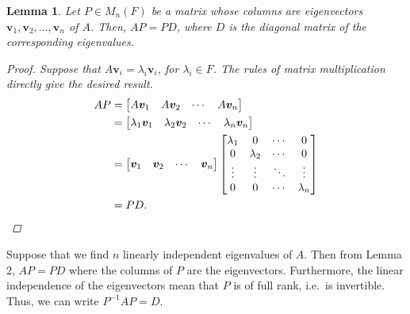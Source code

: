 \documentclass[10pt]{article}
\def\v{\bm{v}}
\newtheorem{lemma}{Lemma}
\begin{document}
        \begin{lemma}
                Let $P \in M_n(F)$ be a matrix whose columns are eigenvectors $\v_1, \v_2, \dots, \v_n$ of $A$.
                Then, $AP = PD$, where $D$ is the diagonal matrix of the corresponding eigenvalues.
                \begin{proof}
                        Suppose that $A\v_i = \lambda_i\v_i$, for $\lambda_i \in F$. The rules of matrix multiplication directly give
                        the desired result.
                        \begin{align*}
                                AP &= \begin{bmatrix} A\v_1 & A\v_2 & \cdots & A\v_n \end{bmatrix}\\
                                &= \begin{bmatrix} \lambda_1\v_1 & \lambda_2\v_2 & \cdots & \lambda_n\v_n \end{bmatrix} \\
                                &= \begin{bmatrix}
                                        \v_1 & \v_2 & \cdots & \v_n
                                \end{bmatrix}
                                \begin{bmatrix}
                                        \lambda_1 & 0 & \cdots & 0 \\
                                        0 & \lambda_2 & \cdots & 0 \\
                                        \vdots & \vdots & \ddots & \vdots \\
                                        0 & 0 & \cdots & \lambda_n
                                \end{bmatrix} \\
                                &= PD.  \qedhere
                        \end{align*}
                \end{proof}
        \end{lemma}

        Suppose that we find $n$ linearly independent eigenvalues of $A$. Then from Lemma 2, $AP = PD$ where the columns of $P$ are the eigenvectors.
        Furthermore, the linear independence of the eigenvectors mean that $P$ is of full rank, i.e.\ is invertible. Thus, we can write
        $P^{-1}AP = D$. \\
        
\end{document}
